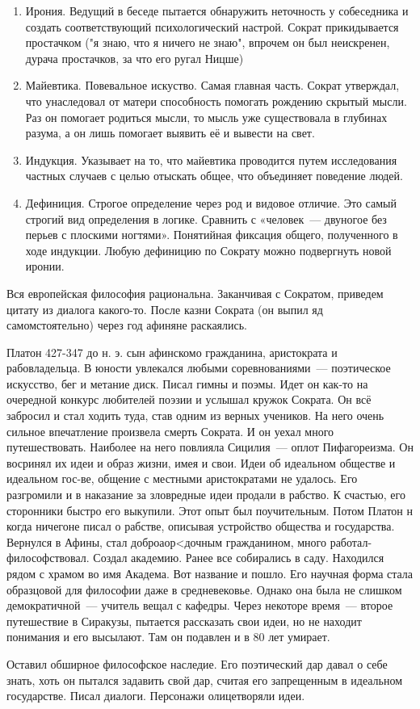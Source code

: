 \begin{enumerate}
	\item Ирония. Ведущий в беседе пытается обнаружить неточность у собеседника и создать соответствующий психологический настрой. 
	Сократ прикидывается простачком ("я знаю, что я ничего не знаю", впрочем он был неискренен, дурача простачков, за что его ругал Ницше) 
	\item Майевтика. Повевальное искуство. Самая главная часть. Сократ утверждал, что унаследовал от матери способность помогать рождению скрытый мысли. 
	Раз он помогает родиться мысли, то мысль уже существовала в глубинах разума, а он лишь помогает выявить её и вывести на свет. 
	\item Индукция. Указывает на то, что майевтика проводится путем исследования частных случаев с целью отыскать общее, что объединяет поведение людей. 
	\item Дефиниция. Строгое определение через род и видовое отличие. Это самый строгий вид определения в логике. Сравнить с «человек~--- двуногое без перьев с плоскими ногтями». 
	Понятийная фиксация общего, полученного в ходе индукции. Любую дефиницию по Сократу можно подвергнуть новой иронии.
\end{enumerate}
	 

Вся европейская философия рациональна. 
Заканчивая с Сократом, приведем цитату из диалога какого-то. 
После казни Сократа (он выпил яд самомстоятельно) через год афиняне раскаялись. 

Платон
427-347 до н. э. сын афинскомо гражданина, аристократа и рабовладельца. В юности увлекался любыми соревнованиями~--- поэтическое искусство, бег и метание диск. Писал гимны и поэмы. 
Идет он как-то на очередной конкурс любителей поэзии и услышал кружок Сократа. Он всё забросил и стал ходить туда, став одним из верных учеников. На него очень сильное впечатление произвела смерть Сократа. 
И он уехал много путешествовать. Наиболее на него повлияла Сицилия~--- оплот Пифагореизма. 
Он восринял их идеи и образ жизни, имея и свои. Идеи об идеальном обществе и идеальном гос-ве, общение с местными аристократами не удалось. 
Его разгромили и в наказание за зловредные идеи продали в рабство. К счастью, его сторонники быстро его выкупили. Этот опыт был поучительным. 
Потом Платон н когда ничегоне писал о рабстве, описывая устройство общества и государства. Вернулся в Афины, стал доброаор<дочным гражданином, много работал-философствовал. 
Создал академию. Ранее все собирались в саду. Находился рядом с храмом во имя Академа. Вот название и пошло. Его научная форма стала образцовой для философии даже в средневековье. 
Однако она была не слишком демократичной~--- учитель вещал с кафедры. Через некоторе время~--- второе путешествие в Сиракузы, пытается рассказать свои идеи, но не находит понимания и его высылают. Там он подавлен и в 80 лет умирает. 

Оставил обширное философское наследие. Его поэтический дар давал о себе знать, хоть он пытался задавить свой дар, считая его запрещенным в идеальном государстве. Писал диалоги. Персонажи олицетворяли идеи. 
